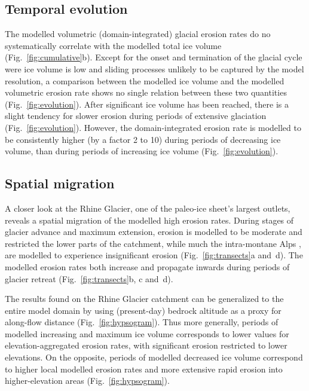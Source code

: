 \documentclass[utf8]{article}
\begin{document}
\subsection{Temporal evolution}

    The modelled volumetric (domain-integrated) glacial erosion rates
    do no systematically correlate with the modelled total ice volume
    (Fig.~\ref{fig:cumulative}b). Except for the onset and termination of the
    glacial cycle were ice volume is low and sliding processes unlikely to be
    captured by the model resolution, a comparison between the modelled ice
    volume and the modelled volumetric erosion rate shows no single relation
    between these two quantities (Fig.~\ref{fig:evolution}). After significant
    ice volume has been reached, there is a slight tendency for slower erosion
    during periods of extensive glaciation (Fig.~\ref{fig:evolution}). However,
    the domain-integrated erosion rate is modelled to be consistently higher
    (by a factor 2 to 10) during periods of decreasing ice volume, than during
    periods of increasing ice volume (Fig.~\ref{fig:evolution}).

\subsection{Spatial migration}

    A closer look at the Rhine Glacier, one of the paleo-ice sheet's largest
    outlets, reveals a spatial migration of the modelled high erosion rates.
    During stages of glacier advance and maximum extension, erosion is modelled
    to be moderate and restricted the lower parts of the catchment, while much
    the intra-montane Alps \citep[modelled to be largely
    cold-based,][Fig.~6c]{Seguinot.etal.2018}, are modelled to experience
    insignificant erosion (Fig.~\ref{fig:transects}a and~d). The modelled
    erosion rates both increase and propagate inwards during periods of glacier
    retreat (Fig.~\ref{fig:transects}b, c and~d).

    The results found on the Rhine Glacier catchment can be generalized to the
    entire model domain by using (present-day) bedrock altitude as a proxy for
    along-flow distance (Fig.~\ref{fig:hypsogram}). Thus more generally,
    periods of modelled increasing and maximum ice volume corresponds to lower
    values for elevation-aggregated erosion rates, with significant erosion
    restricted to lower elevations. On the opposite, periods of modelled
    decreased ice volume correspond to higher local modelled erosion rates and
    more extensive rapid erosion into higher-elevation areas
    (Fig.~\ref{fig:hypsogram}).
\end{document}
